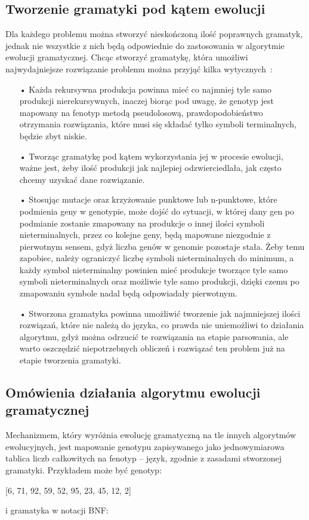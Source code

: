 \subsection{Tworzenie gramatyki pod kątem ewolucji}
\label{grammarCreation}
Dla każdego problemu można stworzyć nieskończoną ilość poprawnych gramatyk, jednak nie wszystkie z nich będą odpowiednie do zastosowania w algorytmie ewolucji gramatycznej. Chcąc stworzyć gramatykę, która umożliwi najwydajniejsze rozwiązanie problemu można przyjąć kilka wytycznych~\cite{grammarDesign}: 
\begin{itemize}
  \item[•] Każda rekursywna produkcja powinna mieć co najmniej tyle samo produkcji nierekursywnych, inaczej biorąc pod uwagę, że genotyp jest mapowany na fenotyp metodą pseudolosową, prawdopodobieństwo otrzymania rozwiązania, które musi się składać tylko symboli terminalnych, będzie zbyt niskie.
  \item[•] Tworząc gramatykę pod kątem wykorzystania jej w procesie ewolucji, ważne jest, żeby ilość produkcji jak najlepiej odzwierciedlała, jak często chcemy uzyskać dane rozwiązanie.
  \item[•] Stosując mutacje oraz krzyżowanie punktowe lub n-punktowe, które podmienia geny w genotypie, może dojść do sytuacji, w której dany gen po podmianie zostanie zmapowany na produkcje o innej ilości symboli nieterminalnych, przez co kolejne geny, będą mapowane niezgodnie z pierwotnym sensem, gdyż liczba genów w genomie pozostaje stała. Żeby temu zapobiec, należy ograniczyć liczbę symboli nieterminalnych do minimum, a każdy symbol nieterminalny powinien mieć produkcje tworzące tyle samo symboli nieterminalnych oraz możliwie tyle samo produkcji, dzięki czemu po zmapowaniu symbole nadal będą odpowiadały pierwotnym. 
  \item[•] Stworzona gramatyka powinna umożliwić tworzenie jak najmniejszej ilości rozwiązań, które nie należą do języka, co prawda nie uniemożliwi to działania algorytmu, gdyż można odrzucić te rozwiązania na etapie parsowania, ale warto oszczędzić niepotrzebnych obliczeń i rozwiązać ten problem już na etapie tworzenia gramatyki. 
\end{itemize}

\subsection{Omówienia działania algorytmu ewolucji gramatycznej}
Mechanizmem, który wyróżnia ewolucję gramatyczną na tle innych algorytmów ewolucyjnych, jest mapowanie genotypu zapisywanego jako jednowymiarowa tablica liczb całkowitych na fenotyp -- język, zgodnie z zasadami stworzonej gramatyki. Przykładem może być genotyp: 
\begin{center} [6, 71, 92, 59, 52, 95, 23, 45, 12, 2] \end{center}
i gramatyka w notacji BNF:

